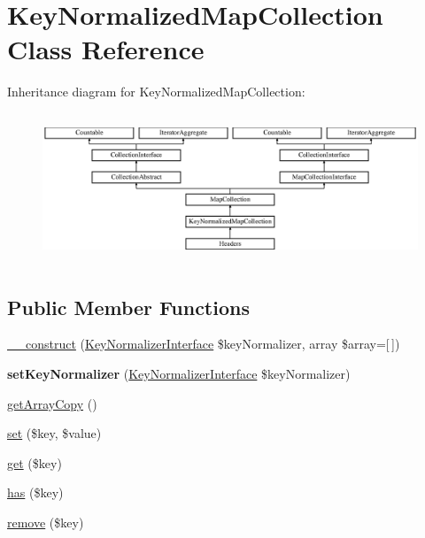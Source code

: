 \hypertarget{class_pes_1_1_collection_1_1_key_normalized_map_collection}{}\section{Key\+Normalized\+Map\+Collection Class Reference}
\label{class_pes_1_1_collection_1_1_key_normalized_map_collection}
Inheritance diagram for Key\+Normalized\+Map\+Collection\+:\begin{figure}[H]
\begin{center}
\leavevmode
\includegraphics[height=4.516129cm]{class_pes_1_1_collection_1_1_key_normalized_map_collection}
\end{center}
\end{figure}
\subsection*{Public Member Functions}
\begin{DoxyCompactItemize}
\item 
\mbox{\hyperlink{class_pes_1_1_collection_1_1_key_normalized_map_collection_a8e87b95407cbad036c407b56eebd35c9}{\+\_\+\+\_\+construct}} (\mbox{\hyperlink{interface_pes_1_1_collection_1_1_normalizer_1_1_key_normalizer_interface}{Key\+Normalizer\+Interface}} \$key\+Normalizer, array \$array=\mbox{[}$\,$\mbox{]})
\item 
\mbox{\label{class_pes_1_1_collection_1_1_key_normalized_map_collection_a983fc207bb5128ebf30ee156fbbb77d7}} 
{\bfseries set\+Key\+Normalizer} (\mbox{\hyperlink{interface_pes_1_1_collection_1_1_normalizer_1_1_key_normalizer_interface}{Key\+Normalizer\+Interface}} \$key\+Normalizer)
\item 
\mbox{\hyperlink{class_pes_1_1_collection_1_1_key_normalized_map_collection_a9c9bae4e44ee76a926fa7ecdc49dd8b5}{get\+Array\+Copy}} ()
\item 
\mbox{\hyperlink{class_pes_1_1_collection_1_1_key_normalized_map_collection_aab787bd83f84f4215dceb35f7c305eee}{set}} (\$key, \$value)
\item 
\mbox{\hyperlink{class_pes_1_1_collection_1_1_key_normalized_map_collection_a24a9bf83a1002d46ece83a93d14bd921}{get}} (\$key)
\item 
\mbox{\hyperlink{class_pes_1_1_collection_1_1_key_normalized_map_collection_a8b23dbb48f0c3c94725695191d06981a}{has}} (\$key)
\item 
\mbox{\hyperlink{class_pes_1_1_collection_1_1_key_normalized_map_collection_a95483af4e2c07dc9893fe058b026bd5d}{remove}} (\$key)
\end{DoxyCompactItemize}
